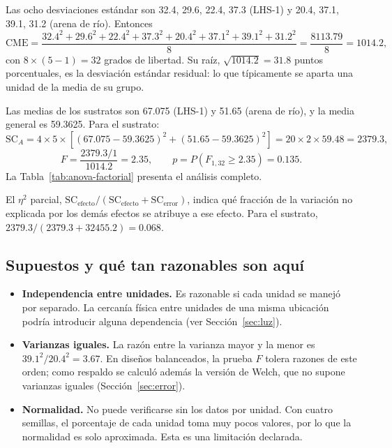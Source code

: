 \documentclass[11pt]{article}
\begin{document}
Las ocho desviaciones estándar son 32.4, 29.6, 22.4, 37.3 (LHS-1) y 20.4, 37.1, 39.1, 31.2 (arena de río). Entonces
\[
\text{CME} = \frac{32.4^2 + 29.6^2 + 22.4^2 + 37.3^2 + 20.4^2 + 37.1^2 + 39.1^2 + 31.2^2}{8} = \frac{8113.79}{8} = 1014.2,
\]
con $8 \times (5 - 1) = 32$ grados de libertad. Su raíz, $\sqrt{1014.2} = 31.8$ puntos porcentuales, es la desviación estándar residual: lo que típicamente se aparta una unidad de la media de su grupo.

Las medias de los sustratos son 67.075 (LHS-1) y 51.65 (arena de río), y la media general es 59.3625. Para el sustrato:
\[
\text{SC}_A = 4 \times 5 \times \left[(67.075 - 59.3625)^2 + (51.65 - 59.3625)^2\right] = 20 \times 2 \times 59.48 = 2379.3,
\]
\[
F = \frac{2379.3 / 1}{1014.2} = 2.35, \qquad p = P(F_{1,32} \ge 2.35) = 0.135 .
\]
La Tabla~\ref{tab:anova-factorial} presenta el análisis completo.

\begin{table}[H]
\caption{\capTabF}\label{tab:anova-factorial}
\end{table}

El $\eta^2$ parcial, $\text{SC}_{\text{efecto}} / (\text{SC}_{\text{efecto}} + \text{SC}_{\text{error}})$, indica qué fracción de la variación no explicada por los demás efectos se atribuye a ese efecto. Para el sustrato, $2379.3 / (2379.3 + 32455.2) = 0.068$.

\subsection{Supuestos y qué tan razonables son aquí}

\begin{itemize}[leftmargin=1.4em,itemsep=2pt]
\item \textbf{Independencia entre unidades.} Es razonable si cada unidad se manejó por separado. La cercanía física entre unidades de una misma ubicación podría introducir alguna dependencia (ver Sección~\ref{sec:luz}).
\item \textbf{Varianzas iguales.} La razón entre la varianza mayor y la menor es $39.1^2 / 20.4^2 = 3.67$. En diseños balanceados, la prueba $F$ tolera razones de este orden; como respaldo se calculó además la versión de Welch, que no supone varianzas iguales (Sección~\ref{sec:error}).
\item \textbf{Normalidad.} No puede verificarse sin los datos por unidad. Con cuatro semillas, el porcentaje de cada unidad toma muy pocos valores, por lo que la normalidad es solo aproximada. Esta es una limitación declarada.
\end{itemize}
\end{document}
